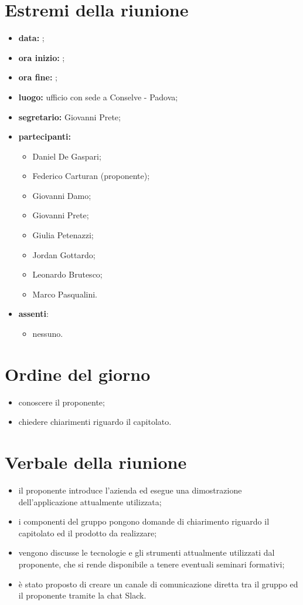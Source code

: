 \documentclass[a4paper,11pt]{article}
\begin{document}
	\section{Estremi della riunione}
	\begin{itemize}
		\item \textbf{data:} ;
		\item \textbf{ora inizio:} ;
		\item \textbf{ora fine:} ;
		\item \textbf{luogo:} ufficio \riskapp{} con sede a Conselve - Padova;
		\item \textbf{segretario:} Giovanni Prete;
		\item \textbf{partecipanti:}
		\begin{itemize}
			\item Daniel De Gaspari;
			\item Federico Carturan (proponente);
			\item Giovanni Damo;
			\item Giovanni Prete;
			\item Giulia Petenazzi;
			\item Jordan Gottardo;
			\item Leonardo Brutesco;
			\item Marco Pasqualini.
		\end{itemize}
			\item  \textbf{assenti}:
		\begin{itemize}
			\item nessuno.
		\end{itemize}
	\end{itemize}
	\section{Ordine del giorno}
		\begin{itemize}
			\item conoscere il proponente;
			\item chiedere chiarimenti riguardo il capitolato.
		\end{itemize}
	\section{Verbale della riunione}
		\begin{itemize}
			\item il proponente introduce l'azienda ed esegue una dimostrazione dell'applicazione attualmente utilizzata;
			\item i componenti del gruppo pongono domande di chiarimento riguardo il capitolato ed il prodotto da realizzare;
			\item vengono discusse le tecnologie e gli strumenti attualmente utilizzati dal proponente, che si rende disponibile a tenere eventuali seminari formativi;
            \item è stato proposto di creare un canale di comunicazione diretta tra il gruppo ed il proponente tramite la chat Slack.

		\end{itemize}
\end{document}
